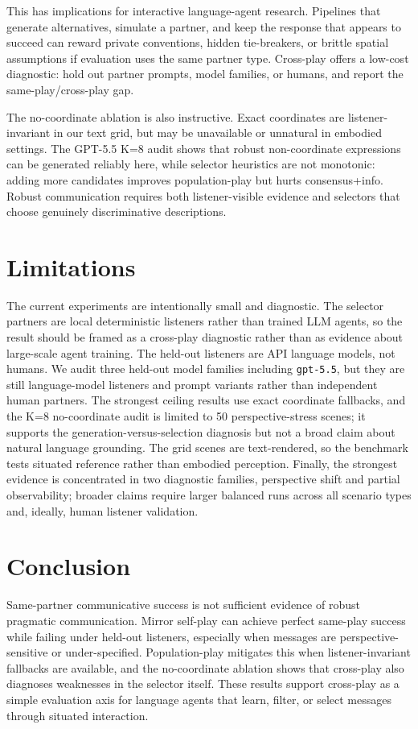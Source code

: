 \documentclass[10pt]{article}
\begin{document}
This has implications for interactive language-agent research. Pipelines that generate alternatives, simulate a partner, and keep the response that appears to succeed can reward private conventions, hidden tie-breakers, or brittle spatial assumptions if evaluation uses the same partner type. Cross-play offers a low-cost diagnostic: hold out partner prompts, model families, or humans, and report the same-play/cross-play gap.

The no-coordinate ablation is also instructive. Exact coordinates are listener-invariant in our text grid, but may be unavailable or unnatural in embodied settings. The GPT-5.5 K=8 audit shows that robust non-coordinate expressions can be generated reliably here, while selector heuristics are not monotonic: adding more candidates improves population-play but hurts consensus+info. Robust communication requires both listener-visible evidence and selectors that choose genuinely discriminative descriptions.

\section{Limitations}

The current experiments are intentionally small and diagnostic. The selector partners are local deterministic listeners rather than trained LLM agents, so the result should be framed as a cross-play diagnostic rather than as evidence about large-scale agent training. The held-out listeners are API language models, not humans. We audit three held-out model families including \texttt{gpt-5.5}, but they are still language-model listeners and prompt variants rather than independent human partners. The strongest ceiling results use exact coordinate fallbacks, and the K=8 no-coordinate audit is limited to 50 perspective-stress scenes; it supports the generation-versus-selection diagnosis but not a broad claim about natural language grounding. The grid scenes are text-rendered, so the benchmark tests situated reference rather than embodied perception. Finally, the strongest evidence is concentrated in two diagnostic families, perspective shift and partial observability; broader claims require larger balanced runs across all scenario types and, ideally, human listener validation.

\section{Conclusion}

Same-partner communicative success is not sufficient evidence of robust pragmatic communication. Mirror self-play can achieve perfect same-play success while failing under held-out listeners, especially when messages are perspective-sensitive or under-specified. Population-play mitigates this when listener-invariant fallbacks are available, and the no-coordinate ablation shows that cross-play also diagnoses weaknesses in the selector itself. These results support cross-play as a simple evaluation axis for language agents that learn, filter, or select messages through situated interaction.



\end{document}
